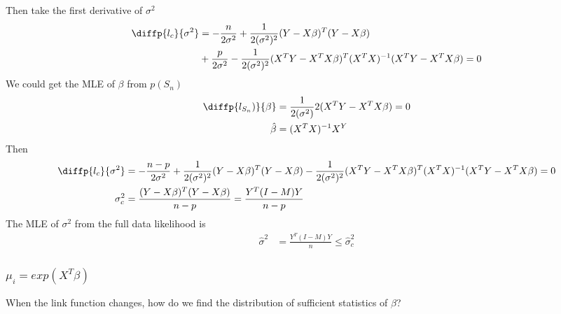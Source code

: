 \documentclass[11pt]{article} %
\begin{document}
Then take the first derivative of $\sigma^2$
\begin{align*}
	\diffp{l_c}{{\sigma^2}} &= -\frac{n}{2 \sigma^2} + \frac{1}{2 (\sigma^2)^2} (Y-X \beta)^T(Y- X \beta)\\
	& + \frac{p}{2 \sigma^2} - \frac{1}{2 (\sigma^2)^2} (X^T Y - X^T X \beta)^T (X^T X)^{-1}(X^T Y - X^T X \beta) = 0
\end{align*}
We could get the MLE of $\beta$ from $p(S_n)$
\begin{align*}
	\diffp{{l_{S_n})}}{{\beta}} &=  \frac{1}{2 (\sigma^2)} 2 (X^T Y - X^T X \beta) = 0\\
	\hat{\beta} &= (X^T X)^{-1} X^ Y
\end{align*}
Then 
\begin{align*}
	\diffp{l_c}{{\sigma^2}} &= -\frac{n-p}{2 \sigma^2} + \frac{1}{2 (\sigma^2)^2} (Y-X \beta)^T(Y- X \beta) - \frac{1}{2 (\sigma^2)^2} (X^T Y - X^T X \beta)^T (X^T X)^{-1}(X^T Y - X^T X \beta) = 0\\
	\sigma_c^2 &= \frac{(Y- X \beta)^T (Y- X \beta)}{n-p} = \frac{Y^T(I-M)Y}{n-p}
\end{align*}
The MLE of $\sigma^2$ from the full data likelihood is 
\begin{align*}
	\hat{\sigma}^2 &= \frac{Y^T(I-M)Y}{n} \leq \hat{\sigma}_c^2
\end{align*}


\subsubsection{$\mu_i = exp(X^T\beta)$}
When the link function changes, how do we find the distribution of sufficient statistics of $\beta$?
\end{document}
